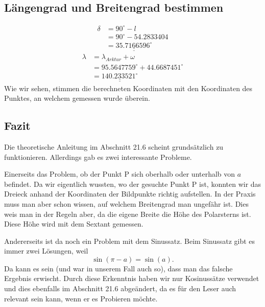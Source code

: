 \subsection{Längengrad und Breitengrad bestimmen}

\begin{align}
	\delta &= 90^\circ - l \nonumber \\
	&= 90^\circ - 54.2833404 \nonumber \\
	&= \underline{\underline{35.7166596^\circ}} \nonumber
\end{align}
\begin{align}
	\lambda &= \lambda_{Arktur} + \omega \nonumber \\
	&= 95.5647759^\circ + 44.6687451^\circ \nonumber \\
	&= \underline{\underline{140.233521^\circ}} \nonumber
\end{align}
Wie wir sehen, stimmen die berechneten Koordinaten mit den Koordinaten des Punktes, an welchem gemessen wurde überein. 

\subsection{Fazit}
Die theoretische Anleitung im Abschnitt 21.6 scheint grundsätzlich zu funktionieren. 
Allerdings gab es zwei interessante Probleme.

Einerseits das Problem, ob der Punkt P sich oberhalb oder unterhalb von $a$ befindet. 
Da wir eigentlich wussten, wo der gesuchte Punkt P ist, konnten wir das Dreieck anhand der Koordinaten der Bildpunkte richtig aufstellen. 
In der Praxis muss man aber schon wissen, auf welchem Breitengrad man ungefähr ist. 
Dies weis man in der Regeln aber, da die eigene Breite die Höhe des Polarsterns ist.
Diese Höhe wird mit dem Sextant gemessen.

Andererseits ist da noch ein Problem mit dem Sinussatz.
Beim Sinussatz gibt es immer zwei Lösungen, weil \[ \sin(\pi-a)=\sin(a).\]
Da kann es sein (und war in unserem Fall auch so), dass man das falsche Ergebnis erwischt. 
Durch diese Erkenntnis haben wir nur Kosinussätze verwendet und dies ebenfalls im Abschnitt 21.6 abgeändert, da es für den Leser auch relevant sein kann, wenn er es Probieren möchte.




